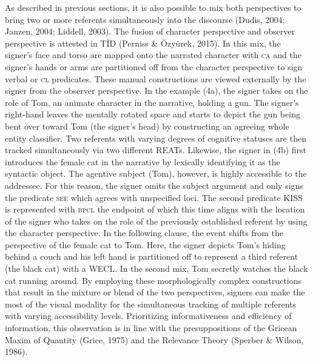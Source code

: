 \documentclass[
  english,
  doc,mask]{apa6}
\begin{document}
As described in previous sections, it is also possible to mix both perspectives to bring two or more referents simultaneously into the discourse (Dudis, 2004; Janzen, 2004; Liddell, 2003). The fusion of character perspective and observer perspective is attested in TİD (Perniss \& Özyürek, 2015). In this mix, the signer's face and torso are mapped onto the narrated character with \textsc{ca} and the signer's hands or arms are partitioned off from the character perspective to sign verbal or \textsc{cl} predicates. These manual constructions are viewed externally by the signer from the observer perspective. In the example (4a), the signer takes on the role of Tom, an animate character in the narrative, holding a gun. The signer's right-hand leaves the mentally rotated space and starts to depict the gun being bent over toward Tom (the signer's head) by constructing an agreeing whole entity classifier. Two referents with varying degrees of cognitive statuses are then tracked simultaneously via two different REATs. Likewise, the signer in (4b) first introduces the female cat in the narrative by lexically identifying it as the syntactic object. The agentive subject (Tom), however, is highly accessible to the addressee. For this reason, the signer omits the subject argument and only signs the predicate \textsc{see} which agrees with unspecified loci. The second predicate \textsc{KISS} is represented with \textsc{bpcl} the endpoint of which this time aligns with the location of the signer who takes on the role of the previously established referent by using the character perspective. In the following clause, the event shifts from the perspective of the female cat to Tom. Here, the signer depicts Tom's hiding behind a couch and his left hand is partitioned off to represent a third referent (the black cat) with a \textsc{WECL}. In the second mix, Tom secretly watches the black cat running around. By employing these morphologically complex constructions that result in the mixture or blend of the two perspectives, signers can make the most of the visual modality for the simultaneous tracking of multiple referents with varying accessibility levels. Prioritizing informativeness and efficiency of information, this observation is in line with the presuppositions of the Gricean Maxim of Quantity (Grice, 1975) and the Relevance Theory (Sperber \& Wilson, 1986).
\end{document}
